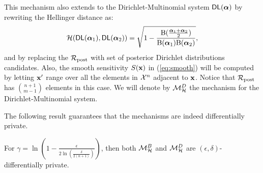 \documentclass[sigconf, anonymous]{acmart}
\begin{document}
This mechanism also extends to the Dirichlet-Multinomial system $\mathsf{DL}(\boldsymbol{\alpha})$ by rewriting the Hellinger distance as:
\[
  \mathcal{H}(\mathsf{DL}(\boldsymbol{\alpha}_1), \mathsf{DL}(\boldsymbol{\alpha}_2)) = \sqrt{1 - \frac{\textup{B}(\frac{\boldsymbol{\alpha}_1 + \boldsymbol{\alpha}_2}{2})}{\textup{B}(\boldsymbol{\alpha}_1) \textup{B}(\boldsymbol{\alpha}_2)}},
\]
and by replacing the $\mathcal{R}_{\textup{post}}$ with set of posterior Dirichlet distributions candidates. Also, the smooth sensitivity $S(\textbf{x})$ in (\ref{eq:smooth}) will be
computed by letting $\textbf{x}'$ range over all the elements in $\mathcal{X}^{n}$ adjacent to $\textbf{x}$.
Notice that $\mathcal{R}_{\textup{post}}$ has $\binom{n + 1}{m - 1}$ elements in this case. We will denote by
$\mathcal{M}^{D}_{\mathcal{H}}$ the mechanism for the Dirichlet-Multinomial system.

The following result guarantees that the mechanisms are indeed differentially private.

\begin{theorem}[Privacy] 
  For  $\gamma=\ln(1 - \frac{\epsilon}{2 \ln (\frac{\delta}{2 (n + 1)})})$, then both
  $\mathcal{M}^{B}_{\mathcal{H}}$ and $\mathcal{M}^{D}_{\mathcal{H}}$ are $(\epsilon,\delta)$-differentially private.
\end{theorem}
\end{document}
